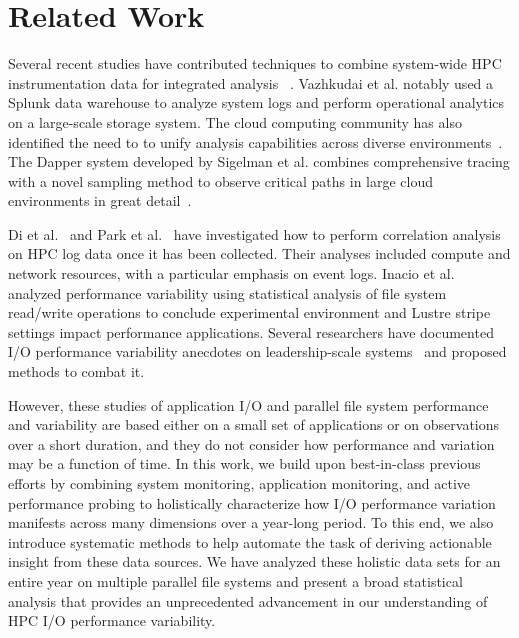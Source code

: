 \section{Related Work} \label{sec:related}

Several recent studies have contributed techniques to combine
system-wide HPC instrumentation data for integrated
analysis~\cite{Lockwood2017,Vazhkudai2017guide,Agelastos2014ldms,Kunkel2014siox,RIOT_2013}
. Vazhkudai et al. notably used a Splunk data warehouse to analyze system
logs and perform operational analytics on a large-scale storage system.
The cloud computing community has also identified the need to to unify
analysis capabilities across diverse environments~\cite{Vazhkudai2017guide}. The Dapper system
developed by Sigelman et al. combines comprehensive tracing with a novel
sampling method to observe critical paths in large cloud environments in great
detail~\cite{Sigelman2010dapper}.

Di et al.~\cite{7973730} and Park et al.~\cite{Park2017BigDM} have
investigated how to perform correlation analysis on HPC log data once it has been
collected.  Their analyses included compute and network resources, with a
particular emphasis on event logs. Inacio et al. analyzed performance variability using statistical analysis of file system read/write operations to conclude experimental environment and Lustre stripe settings impact performance applications. 
Several researchers have documented 
I/O performance variability anecdotes on leadership-scale
systems~\cite{Lofstead2010,Yildiz2016,carns2011understanding} and proposed
methods to combat it.  

However, these studies of application I/O and parallel file system performance and variability are based either on a small set of applications or on observations over a short duration, and they do not consider how performance and variation may be a function of time.
In this work, we build upon best-in-class previous efforts by combining system monitoring, application monitoring, and active performance probing
to holistically characterize how I/O performance variation manifests across many dimensions over a year-long period.
To this end, we also introduce systematic methods to help automate the task of deriving actionable insight from these data sources.
We have analyzed these holistic data sets for an entire year on multiple parallel file systems and present a broad statistical analysis that provides an unprecedented advancement in our understanding of HPC I/O performance variability.
